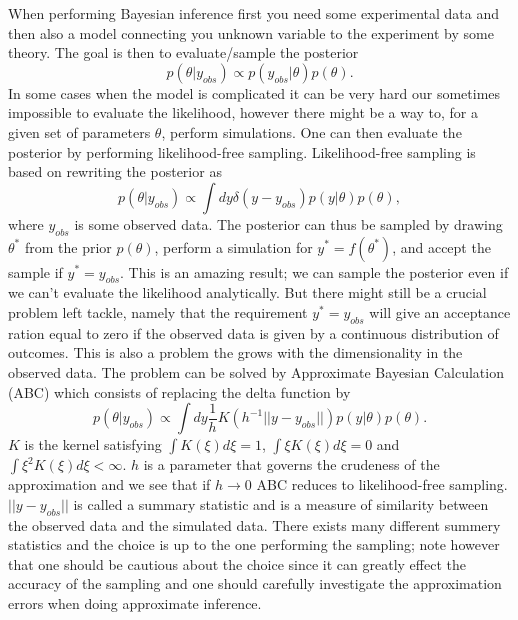 \documentclass[11pt,a4paper]{article}
\begin{document}
When performing Bayesian inference first you need some experimental data and then also a model connecting you unknown variable to the experiment by some theory. The goal is then to evaluate/sample the posterior
\begin{equation*}
    p(\theta|y_{obs}) \propto p(y_{obs}|\theta) p(\theta).
\end{equation*}
In some cases when the model is complicated it can be very hard our sometimes impossible to evaluate the likelihood, however there might be a way to, for a given set of parameters $\theta$, perform simulations. One can then evaluate the posterior by performing likelihood-free sampling. Likelihood-free sampling is based on rewriting the posterior as
\begin{equation*}
    p(\theta|y_{obs}) \propto \int d y \delta(y-y_{obs})p(y|\theta) p(\theta),
\end{equation*}
where $y_{obs}$ is some observed data. The posterior can thus be sampled by drawing $\theta^*$ from the prior $p(\theta)$, perform a simulation for $y^*  = f(\theta^*)$, and accept the sample if $y^* = y_{obs}$. This is an amazing result; we can sample the posterior even if we can't evaluate the likelihood analytically. But there might still be a crucial problem left tackle, namely that the requirement  $y^* = y_{obs}$ will give an acceptance ration equal to zero if the observed data is given by a continuous distribution of outcomes. This is also a problem the grows with the dimensionality in the observed data. The problem can be solved by Approximate Bayesian Calculation (ABC) which consists of replacing the delta function by 
\begin{equation*}
    p(\theta|y_{obs}) \propto \int d y \frac{1}{h}K\left(h^{-1}{||y - y_{obs}||}\right) p(y|\theta) p(\theta).
\end{equation*}
$K$ is the kernel satisfying $\int K(\xi)d\xi = 1$, $\int\xi K(\xi)d\xi = 0$ and $\int \xi^2K(\xi)d\xi < \infty$. $h$ is a parameter that governs the crudeness of the approximation and we see that if $h\to 0$ ABC reduces to likelihood-free sampling. $||y - y_{obs}||$ is called a summary statistic and is a measure of similarity between the observed data and the simulated data. There exists many different summery statistics and the choice is up to the one performing the sampling; note however that one should be cautious about the choice since it can greatly effect the accuracy of the sampling and one should carefully investigate the approximation errors when doing approximate inference.
\end{document}
